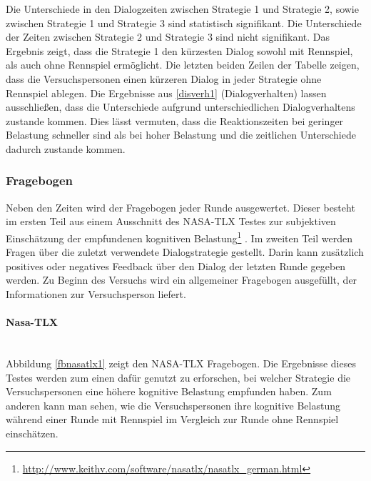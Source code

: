 \documentclass[12pt,a4paper]{scrartcl}
\begin{document}
Die Unterschiede in den Dialogzeiten zwischen Strategie 1 und Strategie 2, sowie zwischen Strategie 1 und Strategie 3 sind statistisch signifikant. Die Unterschiede der Zeiten zwischen Strategie 2 und Strategie 3 sind nicht signifikant. Das Ergebnis zeigt, dass die Strategie 1 den kürzesten Dialog sowohl mit Rennspiel, als auch ohne Rennspiel ermöglicht. Die letzten beiden Zeilen der Tabelle zeigen, dass die Versuchspersonen einen kürzeren Dialog in jeder Strategie ohne Rennspiel ablegen. Die Ergebnisse aus \ref{disverh1} (Dialogverhalten) lassen ausschließen, dass die Unterschiede aufgrund unterschiedlichen Dialogverhaltens zustande kommen. Dies lässt vermuten, dass die Reaktionszeiten bei geringer Belastung schneller sind als bei hoher Belastung und die zeitlichen Unterschiede dadurch zustande kommen. 
\subsubsection{Fragebogen}
\label{fragebogen1}
Neben den Zeiten wird der Fragebogen jeder Runde ausgewertet. Dieser besteht im ersten Teil aus einem Ausschnitt des NASA-TLX Testes zur subjektiven Einschätzung der empfundenen kognitiven Belastung\footnote{\label{foot:nasatlx1}\url{http://www.keithv.com/software/nasatlx/nasatlx_german.html}} . Im zweiten Teil werden Fragen über die zuletzt verwendete Dialogstrategie gestellt. Darin kann zusätzlich positives oder negatives Feedback über den Dialog der letzten Runde gegeben werden. Zu Beginn des Versuchs wird ein allgemeiner Fragebogen ausgefüllt, der Informationen zur Versuchsperson liefert. 
\paragraph{Nasa-TLX}
~\\
Abbildung \ref{fbnasatlx1} zeigt den NASA-TLX Fragebogen. 
Die Ergebnisse dieses Testes werden zum einen dafür genutzt zu erforschen, bei welcher Strategie die Versuchspersonen eine höhere kognitive Belastung empfunden haben. Zum anderen kann man sehen, wie die Versuchspersonen ihre kognitive Belastung während einer Runde mit Rennspiel im Vergleich zur Runde ohne Rennspiel einschätzen. 
\end{document}
